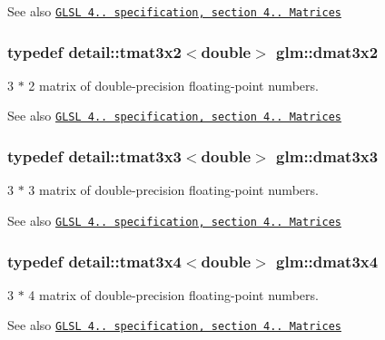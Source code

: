 \begin{DoxySeeAlso}{See also}
\href{http://www.opengl.org/registry/doc/GLSLangSpec.4.20.8.pdf}{\tt G\+L\+S\+L 4.. specification, section 4.. Matrices} 
\end{DoxySeeAlso}
\hypertarget{group__core__types_ga44d603bc9ed3688928f508fb161c71f0}{}
\subsubsection[{dmat3x2}]{\setlength{\rightskip}{0pt plus 5cm}typedef detail\+::tmat3x2$<$double$>$ {\bf glm\+::dmat3x2}}\label{group__core__types_ga44d603bc9ed3688928f508fb161c71f0}
3 $\ast$ 2 matrix of double-\/precision floating-\/point numbers.

\begin{DoxySeeAlso}{See also}
\href{http://www.opengl.org/registry/doc/GLSLangSpec.4.20.8.pdf}{\tt G\+L\+S\+L 4.. specification, section 4.. Matrices} 
\end{DoxySeeAlso}
\hypertarget{group__core__types_ga415251df22cffb39bc14078ff057a6c3}{}
\subsubsection[{dmat3x3}]{\setlength{\rightskip}{0pt plus 5cm}typedef detail\+::tmat3x3$<$double$>$ {\bf glm\+::dmat3x3}}\label{group__core__types_ga415251df22cffb39bc14078ff057a6c3}
3 $\ast$ 3 matrix of double-\/precision floating-\/point numbers.

\begin{DoxySeeAlso}{See also}
\href{http://www.opengl.org/registry/doc/GLSLangSpec.4.20.8.pdf}{\tt G\+L\+S\+L 4.. specification, section 4.. Matrices} 
\end{DoxySeeAlso}
\hypertarget{group__core__types_ga9ec18b898499ad524dc93f2d4d78b877}{}
\subsubsection[{dmat3x4}]{\setlength{\rightskip}{0pt plus 5cm}typedef detail\+::tmat3x4$<$double$>$ {\bf glm\+::dmat3x4}}\label{group__core__types_ga9ec18b898499ad524dc93f2d4d78b877}
3 $\ast$ 4 matrix of double-\/precision floating-\/point numbers.

\begin{DoxySeeAlso}{See also}
\href{http://www.opengl.org/registry/doc/GLSLangSpec.4.20.8.pdf}{\tt G\+L\+S\+L 4.. specification, section 4.. Matrices} 
\end{DoxySeeAlso}
\hypertarget{group__core__types_ga68b5efb5d529f9031481ef36f9babd96}{}
